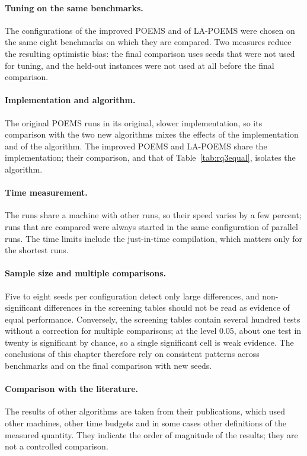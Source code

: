 \paragraph{Tuning on the same benchmarks.} The configurations of the improved POEMS and of LA-POEMS were chosen on the same eight benchmarks on which they are compared. Two measures reduce the resulting optimistic bias: the final comparison uses seeds that were not used for tuning, and the held-out instances were not used at all before the final comparison.

\paragraph{Implementation and algorithm.} The original POEMS runs in its original, slower implementation, so its comparison with the two new algorithms mixes the effects of the implementation and of the algorithm. The improved POEMS and LA-POEMS share the implementation; their comparison, and that of Table~\ref{tab:rq3equal}, isolates the algorithm.

\paragraph{Time measurement.} The runs share a machine with other runs, so their speed varies by a few percent; runs that are compared were always started in the same configuration of parallel runs. The time limits include the just-in-time compilation, which matters only for the shortest runs.

\paragraph{Sample size and multiple comparisons.} Five to eight seeds per configuration detect only large differences, and non-significant differences in the screening tables should not be read as evidence of equal performance. Conversely, the screening tables contain several hundred tests without a correction for multiple comparisons; at the level 0.05, about one test in twenty is significant by chance, so a single significant cell is weak evidence. The conclusions of this chapter therefore rely on consistent patterns across benchmarks and on the final comparison with new seeds.

\paragraph{Comparison with the literature.} The results of other algorithms are taken from their publications, which used other machines, other time budgets and in some cases other definitions of the measured quantity. They indicate the order of magnitude of the results; they are not a controlled comparison.
